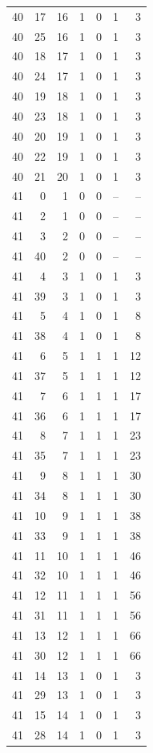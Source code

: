 \begin{longtable}{rrrrrrr}
40 & 17 & 16 & 1 & 0 & 1 & 3\\
40 & 25 & 16 & 1 & 0 & 1 & 3\\
40 & 18 & 17 & 1 & 0 & 1 & 3\\
40 & 24 & 17 & 1 & 0 & 1 & 3\\
40 & 19 & 18 & 1 & 0 & 1 & 3\\
40 & 23 & 18 & 1 & 0 & 1 & 3\\
40 & 20 & 19 & 1 & 0 & 1 & 3\\
40 & 22 & 19 & 1 & 0 & 1 & 3\\
40 & 21 & 20 & 1 & 0 & 1 & 3\\
41 & 0 & 1 & 0 & 0 & -- & --\\
41 & 2 & 1 & 0 & 0 & -- & --\\
41 & 3 & 2 & 0 & 0 & -- & --\\
41 & 40 & 2 & 0 & 0 & -- & --\\
41 & 4 & 3 & 1 & 0 & 1 & 3\\
41 & 39 & 3 & 1 & 0 & 1 & 3\\
41 & 5 & 4 & 1 & 0 & 1 & 8\\
41 & 38 & 4 & 1 & 0 & 1 & 8\\
41 & 6 & 5 & 1 & 1 & 1 & 12\\
41 & 37 & 5 & 1 & 1 & 1 & 12\\
41 & 7 & 6 & 1 & 1 & 1 & 17\\
41 & 36 & 6 & 1 & 1 & 1 & 17\\
41 & 8 & 7 & 1 & 1 & 1 & 23\\
41 & 35 & 7 & 1 & 1 & 1 & 23\\
41 & 9 & 8 & 1 & 1 & 1 & 30\\
41 & 34 & 8 & 1 & 1 & 1 & 30\\
41 & 10 & 9 & 1 & 1 & 1 & 38\\
41 & 33 & 9 & 1 & 1 & 1 & 38\\
41 & 11 & 10 & 1 & 1 & 1 & 46\\
41 & 32 & 10 & 1 & 1 & 1 & 46\\
41 & 12 & 11 & 1 & 1 & 1 & 56\\
41 & 31 & 11 & 1 & 1 & 1 & 56\\
41 & 13 & 12 & 1 & 1 & 1 & 66\\
41 & 30 & 12 & 1 & 1 & 1 & 66\\
41 & 14 & 13 & 1 & 0 & 1 & 3\\
41 & 29 & 13 & 1 & 0 & 1 & 3\\
41 & 15 & 14 & 1 & 0 & 1 & 3\\
41 & 28 & 14 & 1 & 0 & 1 & 3\\

\end{longtable}
